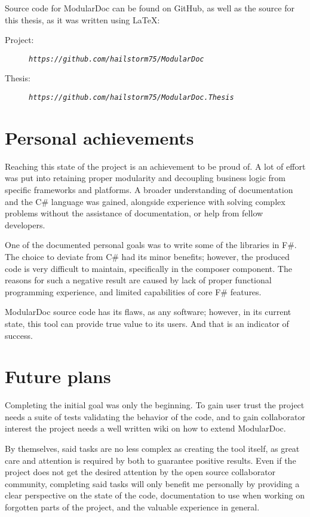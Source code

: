 Source code for ModularDoc can be found on GitHub, as well as the source for this thesis, as it was written using \LaTeX:
\begin{description}
    \item[Project:] \textit{\nolinkurl{https://github.com/hailstorm75/ModularDoc}}
    \item[Thesis:] \textit{\nolinkurl{https://github.com/hailstorm75/ModularDoc.Thesis}}
\end{description}

\section*{Personal achievements}

Reaching this state of the project is an achievement to be proud of. A lot of effort was put into retaining proper modularity and decoupling business logic from specific frameworks and platforms. A broader understanding of documentation and the C\# language was gained, alongside experience with solving complex problems without the assistance of documentation, or help from fellow developers.

One of the documented personal goals was to write some of the libraries in F\#. The choice to deviate from C\# had its minor benefits; however, the produced code is very difficult to maintain, specifically in the composer component. The reasons for such a negative result are caused by lack of proper functional programming experience, and limited capabilities of core F\# features.

ModularDoc source code has its flaws, as any software; however, in its current state, this tool can provide true value to its users. And that is an indicator of success.

\section*{Future plans}

Completing the initial goal was only the beginning. To gain user trust the project needs a suite of tests validating the behavior of the code, and to gain collaborator interest the project needs a well written wiki on how to extend ModularDoc.

By themselves, said tasks are no less complex as creating the tool itself, as great care and attention is required by both to guarantee positive results. Even if the project does not get the desired attention by the open source collaborator community, completing said tasks will only benefit me personally by providing a clear perspective on the state of the code, documentation to use when working on forgotten parts of the project, and the valuable experience in general.
